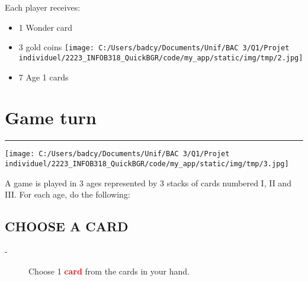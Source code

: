 \documentclass{scrartcl}%
\begin{document}
%
Each player receives:
%
\begin{itemize}%
\item%
%
 1 Wonder card
%
\item%
%
 3 gold coins%
\texttt{[image: C:/Users/badcy/Documents/Unif/BAC 3/Q1/Projet individuel/2223\_INFOB318\_QuickBGR/code/my\_app/static/img/tmp/2.jpg]}%

%
\item%
%
 7 Age 1 cards
%
\end{itemize}

%
\sectionfont{\color{red}}%
\subsectionfont{\color{red}}%
\subsubsectionfont{\color{red}}%
\section{ Game turn
}%
\label{sec:Gameturn}%
\textcolor{red}{\rule{18cm}{0.07cm}}\break%
%
\begin{center}\texttt{[image: C:/Users/badcy/Documents/Unif/BAC 3/Q1/Projet individuel/2223\_INFOB318\_QuickBGR/code/my\_app/static/img/tmp/3.jpg]}\end{center}%

%
A game is played in 3 ages represented by 3 stacks of cards numbered I, II and III. For each age, do the following:


%
\subsection{ CHOOSE A CARD
}%
\label{subsec:CHOOSEACARD}%
\begin{description}%
\item[{-} ]%
%
 Choose 1 %
\textcolor{red}{%
\textbf{card}%
}%
\textit{ }%
 from the cards in your hand.
%
\end{description}

%
\end{document}
